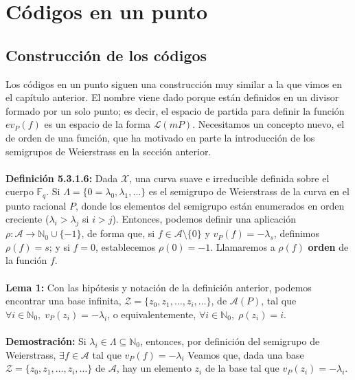 \documentclass[11pt,spanish]{book}
\begin{document}
\section{Códigos en un punto}
\subsection{Construcción de los códigos}
Los códigos en un punto siguen una construcción muy similar a la que vimos en el capítulo anterior. El nombre viene dado porque están definidos en un divisor formado por un solo punto; es decir, el espacio de partida para definir la función $ev_P(f)$ es un espacio de la forma $\mathcal{L}(mP)$. Necesitamos un concepto nuevo, el de orden de una función, que ha motivado en parte la introducción de los semigrupos de Weierstrass en la sección anterior. \\
\\ \textbf{Definición 5.3.1.6: } Dada $\mathbf{\mathcal{X}}$, una curva suave e irreducible definida sobre el cuerpo $\mathbb{F}_q$. Si $\Lambda=\{0=\lambda_0, \lambda_1,\ldots\}$ es el semigrupo de Weierstrass de la curva en el punto racional $P$, donde los elementos del semigrupo están enumerados en orden creciente ($\lambda_{i}>\lambda_{j}$ si $i>j$). Entonces, podemos definir una aplicación $\rho:\mathcal{A}\rightarrow \mathbb{N}_0\cup \{-1\}$, de forma que, si $f\in\mathcal{A}\setminus\{0\}$ y $v_P(f)=-\lambda_s$, definimos $\rho (f)=s$; y si $f=0$, establecemos $\rho (0)=-1$. Llamaremos a $\rho (f)$ \textbf{orden} de la función $f$. \\
\\ \textbf{Lema 1:} Con las hipótesis y notación de la definición anterior, podemos encontrar una base infinita, $\mathcal{Z}=\{z_0,z_1,\ldots,z_i,\ldots\}$, de $\mathcal{A}(P)$, tal que $\forall i\in\mathbb{N}_0,\;v_P(z_i)=-\lambda_i$, o equivalentemente, $\forall i\in\mathbb{N}_0,\;\rho(z_i)=i$.\\
\\ \textbf{Demostración:}
Si $\lambda_i\in \Lambda\subseteq \mathbb{N}_0$, entonces, por definición del semigrupo de Weierstrass,  $\exists f\in \mathcal{A}$ tal que $v_{P}(f)=-\lambda_i$ Veamos que, dada una base $\mathcal{Z}=\{z_0,z_1,\ldots,z_i,\ldots\}$ de $\mathcal{A}$, hay un elemento $z_i$ de la base tal que $v_P(z_i)=-\lambda_i$.\\
\end{document}

